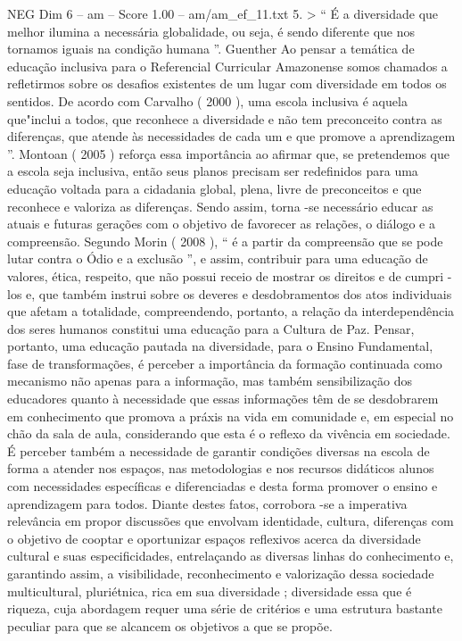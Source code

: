 \begin{textsample}{NEG Dim 6 – am – Score 1.00 – am/am\_ef\_11.txt}  \label{ex:f6_neg_030}
5. > “ É a diversidade que melhor ilumina a necessária globalidade, ou seja, é sendo diferente que nos tornamos iguais na condição humana ”.
Guenther Ao pensar a temática de educação inclusiva para o Referencial Curricular Amazonense somos chamados a refletirmos sobre os desafios existentes de um lugar com diversidade em todos os sentidos.
De acordo com Carvalho ( 2000 ), uma escola inclusiva é aquela que"inclui a todos, que reconhece a diversidade e não tem preconceito contra as diferenças, que atende às necessidades de cada um e que promove a aprendizagem ”.
Montoan ( 2005 ) reforça essa importância ao afirmar que, se pretendemos que a escola seja inclusiva, então seus planos precisam ser redefinidos para uma educação voltada para a cidadania global, plena, livre de preconceitos e que reconhece e valoriza as diferenças.
Sendo assim, torna -se necessário educar as atuais e futuras gerações com o objetivo de favorecer as relações, o diálogo e a compreensão.
Segundo Morin ( 2008 ), “ é a partir da compreensão que se pode lutar contra o Ódio e a exclusão ”, e assim, contribuir para uma educação de valores, ética, respeito, que não possui receio de mostrar os direitos e de cumpri -los e, que também instrui sobre os deveres e desdobramentos dos atos individuais que afetam a totalidade, compreendendo, portanto, a relação da interdependência dos seres humanos constitui uma educação para a Cultura de Paz.
Pensar, portanto, uma educação pautada na diversidade, para o Ensino Fundamental, fase de transformações, é perceber a importância da formação continuada como mecanismo não apenas para a informação, mas também sensibilização dos educadores quanto à necessidade que essas informações têm de se desdobrarem em conhecimento que promova a práxis na vida em comunidade e, em especial no chão da sala de aula, considerando que esta é o reflexo da vivência em sociedade.
É perceber também a necessidade de garantir condições diversas na escola de forma a atender nos espaços, nas metodologias e nos recursos didáticos alunos com necessidades específicas e diferenciadas e desta forma promover o ensino e aprendizagem para todos.
Diante destes fatos, corrobora -se a imperativa relevância em propor discussões que envolvam identidade, cultura, diferenças com o objetivo de cooptar e oportunizar espaços reflexivos acerca da diversidade cultural e suas especificidades, entrelaçando as diversas linhas do conhecimento e, garantindo assim, a visibilidade, reconhecimento e valorização dessa sociedade multicultural, pluriétnica, rica em sua diversidade ; diversidade essa que é riqueza, cuja abordagem requer uma série de critérios e uma estrutura bastante peculiar para que se alcancem os objetivos a que se propõe.

\end{textsample}
